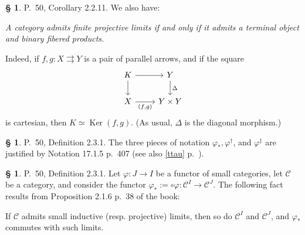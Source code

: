 \documentclass[12pt]{article}
\theoremstyle{remark}
\theoremstyle{definition}
\newtheorem{s}[thm]{\S}
\newcommand{\C}{\mathcal C}
\newcommand{\pp}{\varphi}
\newcommand{\parar}{\rightrightarrows}
\newcommand{\xr}{\xrightarrow}
\DeclareMathOperator{\id}{id}
\DeclareMathOperator{\Ker}{Ker}
\begin{document}
\begin{comment}
$$
\begin{tikzcd}
F(X)\ar{r}{F(f)}&F(Y)\ar{d}[swap]{r_{X,f:X\to Y}}\ar{r}{F(z)}&F(Z)\ar{d}{r_{Y,z:Y\to Z}}\\ 
G(X)\ar{r}[swap]{G(f)}&G(Y)\ar{r}[swap]{G(z)}&G(Z).
\end{tikzcd}
$$

For instance, to verify that the composition $R\to L\to R$ is the identity of $R$, we start with a family $r$ as in \eqref{r_X}, we form the family $\ell$ given by \eqref{rid_X}, and we show that the family 
$$
\Big(\big(r_{Y,\id_Y:Y\to Y}:F(Y)\to G(Y)\big)_{y:X\to Y}\Big)_X
$$ 
coincides with $r$ by observing that the diagram 
$$
X\xr yY\xr{\id_Y}Y
$$  
gives rise, by \eqref{Y,z:Yto Z}, to the equality 
$$
r_{Y,\id_Y:Y\to Y}=r_{X,y:X\to Y}:
$$

$$
\begin{tikzcd}
F(X)\ar{r}{F(y)}&F(Y)\ar{d}[swap]{r_{X,y:X\to Y}}\ar{r}{\id_{F(Y)}}&F(Y)\ar{d}{r_{Y,\id_Y:Y\to Y}}\\ 
G(X)\ar{r}[swap]{G(y)}&G(Y)\ar{r}[swap]{\id_{G(Y)}}&G(Y).
\end{tikzcd}
$$
\end{s}
\end{comment}

%

\begin{s}\label{fpl}
P.~50, Corollary 2.2.11. We also have:

\emph{A category admits finite projective limits if and only if it admits a terminal object and binary fibered products.}

Indeed, if $f,g:X\parar Y$ is a pair of parallel arrows, and if the square 
$$
\begin{tikzcd}
K\ar{d}\ar{r}&Y\ar{d}{\Delta}\\ 
X\ar{r}[swap]{(f,g)}&Y\times Y
\end{tikzcd}
$$
is cartesian, then $K\simeq\Ker(f,g)$. (As usual, $\Delta$ is the diagonal morphism.)
\end{s}

%

\begin{s}
P.~50, Definition 2.3.1. The three pieces of notation $\pp_*,\pp^\dagger$, and $\pp^\ddagger$ are justified by Notation 17.1.5 p.~407 (see also \eqref{ttau} p.~\pageref{ttau}). 
\end{s} 

% 

\begin{s}\label{phistar}
P.~50, Definition 2.3.1. Let $\pp:J\to I$ be a functor of small categories, let $\C$ be a category, and consider the functor $\pp_*:=\circ\pp:\C^I\to\C^J$. The following fact results from Proposition 2.1.6 p.~38 of the book: 

If $\C$ admits small inductive (resp. projective) limits, then so do $\C^I$ and $\C^J$, and $\pp_*$ commutes with such limits. 
\end{s} 
\end{document}
